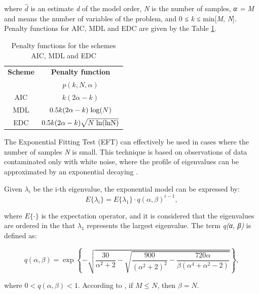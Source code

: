 \documentclass{bmcart}
\begin{document}
where $\hat{d}$ is an estimate \emph{d} of the model order, \emph{N} is the number of samples, \emph{α = M} and means the number of variables of the problem, and 0 ≤ \emph{k} ≤ min[\emph{M}, \emph{N}]. Penalty functions for AIC, MDL and EDC are given by the Table \ref{tab:tab2}.

\begin{table}[h!]
  \centering
  \caption{Penalty functions for the schemes AIC, MDL and EDC}
  \label{tab:tab2}
  \begin{tabular}{*2c}
	\toprule
	\textbf{Scheme} &  \textbf{Penalty function} \\
	\textbf{} &  $p(k,N,\alpha)$ \\
	\midrule
    AIC	& $k(2\alpha - k)$ \\
    MDL	& $0.5k(2\alpha - k) \hspace{1 mm} {\rm log} (N)$ \\
    EDC	& $0.5k(2\alpha - k)\sqrt{N\hspace{1 mm}\rm ln(\rm ln N)}$ \\
    \bottomrule
  \end{tabular}
\end{table}

The Exponential Fitting Test (EFT) can effectively be used in cases where the number of samples \emph{N} is small. This technique is based on observations of data contaminated only with white noise, where the profile of eigenvalues can be approximated by an exponential decaying \cite{grouffaud1996some}.

Given $\lambda_i$ be the i-th eigenvalue, the exponential model can be expressed by:
\begin{equation}\label{eq:eq3}
E\{\lambda_i\} = E\{\lambda_1\} \cdot q(\alpha,\beta)^{i-1},
\end{equation}

where $E\{\cdot\} $ is the expectation operator, and it is considered that the eigenvalues are ordered in the that $\lambda_1$ represents the largest eigenvalue. The term \emph{q(α, β)} is defined as:

\begin{equation}\label{eq:eq4}
q(\alpha,\beta) = \exp\left\{-\sqrt{\frac{30}{\alpha^2 + 2} - \sqrt{\frac{900}{(\alpha^2 + 2)^2} - \frac{720\alpha}{\beta(\alpha^4 + \alpha^2 - 2)}}} \right\},
\end{equation}

where $0 < q(\alpha,\beta) < 1$. According to \cite{quinlan2006model}, if $M \leq N$, then $\beta = N$.
\end{document}
